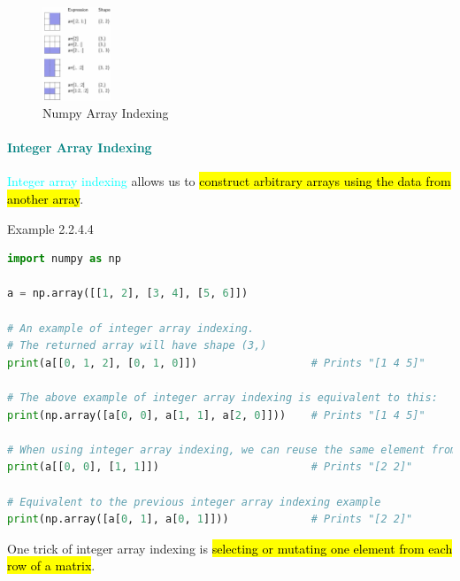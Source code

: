 \documentclass{book}
\begin{document}
\begin{figure}[h]
    \centering
    \includegraphics[width = 0.181\textwidth]{chapter 2/ch2_figure1.jpeg}
    \caption{Numpy Array Indexing}
\end{figure}
\newpage
\textcolor{teal}{\paragraph{Integer Array Indexing}}
\textcolor{cyan}{Integer array indexing} allows us to \hl{construct arbitrary arrays using the data from another array}.\\
\begin{egBox}{Example 2.2.4.4}{}
    \begin{lstlisting}[language=Python, basicstyle=\ttfamily\small, keywordstyle=\color{blue}, commentstyle=\color{forestgreen}, stringstyle=\color{red}, showstringspaces=false]
import numpy as np

a = np.array([[1, 2], [3, 4], [5, 6]])

# An example of integer array indexing.
# The returned array will have shape (3,)
print(a[[0, 1, 2], [0, 1, 0]])                  # Prints "[1 4 5]"

# The above example of integer array indexing is equivalent to this:
print(np.array([a[0, 0], a[1, 1], a[2, 0]]))    # Prints "[1 4 5]"

# When using integer array indexing, we can reuse the same element from the source array:
print(a[[0, 0], [1, 1]])                        # Prints "[2 2]"

# Equivalent to the previous integer array indexing example
print(np.array([a[0, 1], a[0, 1]]))             # Prints "[2 2]"
    \end{lstlisting}
\end{egBox}
One trick of integer array indexing is \hl{selecting or mutating one element from each row of a matrix}.
\end{document}
